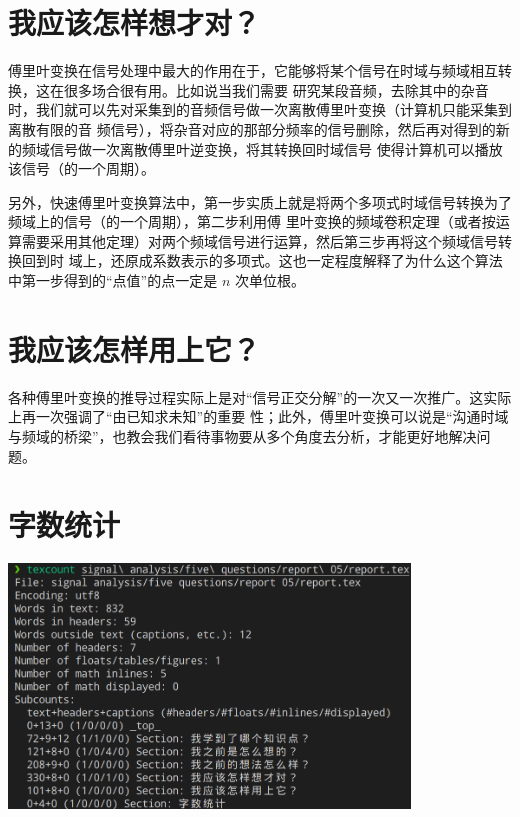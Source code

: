 \documentclass{ctexart}
\begin{document}
    \section{我应该怎样想才对？}

    傅里叶变换在信号处理中最大的作用在于，它能够将某个信号在时域与频域相互转换，这在很多场合很有用。比如说当我们需要
    研究某段音频，去除其中的杂音时，我们就可以先对采集到的音频信号做一次离散傅里叶变换（计算机只能采集到离散有限的音
    频信号），将杂音对应的那部分频率的信号删除，然后再对得到的新的频域信号做一次离散傅里叶逆变换，将其转换回时域信号
    使得计算机可以播放该信号（的一个周期）。

    另外，快速傅里叶变换算法中，第一步实质上就是将两个多项式时域信号转换为了频域上的信号（的一个周期），第二步利用傅
    里叶变换的频域卷积定理（或者按运算需要采用其他定理）对两个频域信号进行运算，然后第三步再将这个频域信号转换回到时
    域上，还原成系数表示的多项式。这也一定程度解释了为什么这个算法中第一步得到的``点值''的点一定是 $n$ 次单位根。

    \section{我应该怎样用上它？}

    各种傅里叶变换的推导过程实际上是对``信号正交分解''的一次又一次推广。这实际上再一次强调了``由已知求未知''的重要
    性；此外，傅里叶变换可以说是``沟通时域与频域的桥梁''，也教会我们看待事物要从多个角度去分析，才能更好地解决问题。

    \section*{字数统计}

    \begin{center}
        \includegraphics[width=0.8\textwidth]{pics/texcount.png}
    \end{center}
\end{document}
